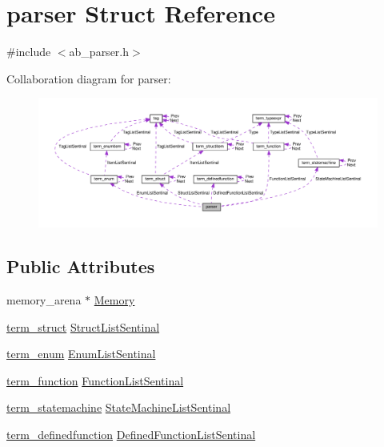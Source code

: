 \hypertarget{structparser}{}\section{parser Struct Reference}
\label{structparser}


{\ttfamily \#include $<$ab\+\_\+parser.\+h$>$}



Collaboration diagram for parser\+:
\nopagebreak
\begin{figure}[H]
\begin{center}
\leavevmode
\includegraphics[width=350pt]{d1/d68/structparser__coll__graph}
\end{center}
\end{figure}
\subsection*{Public Attributes}
\begin{DoxyCompactItemize}
\item 
memory\+\_\+arena $\ast$ \hyperlink{structparser_ae92434364d983495b64df17550f40d27}{Memory}
\item 
\hyperlink{structterm__struct}{term\+\_\+struct} \hyperlink{structparser_accfacf760af582468d591a06259406be}{Struct\+List\+Sentinal}
\item 
\hyperlink{structterm__enum}{term\+\_\+enum} \hyperlink{structparser_a8023ac3e70ded1ba71e6a2974a9e22b6}{Enum\+List\+Sentinal}
\item 
\hyperlink{structterm__function}{term\+\_\+function} \hyperlink{structparser_a43e51e28e997b7acf6121eb6e6a894f1}{Function\+List\+Sentinal}
\item 
\hyperlink{structterm__statemachine}{term\+\_\+statemachine} \hyperlink{structparser_aa29d6dda9d3d933604823ec27584f162}{State\+Machine\+List\+Sentinal}
\item 
\hyperlink{structterm__definedfunction}{term\+\_\+definedfunction} \hyperlink{structparser_a536dbd6d3a451a05b2365772bd5533a5}{Defined\+Function\+List\+Sentinal}
\end{DoxyCompactItemize}


